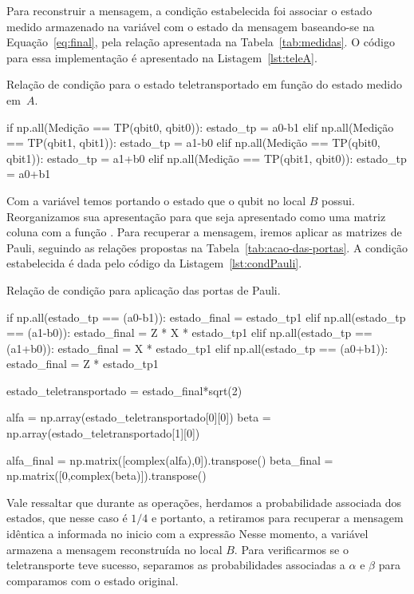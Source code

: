 Para reconstruir a mensagem, a condição estabelecida foi associar o estado medido armazenado na variável  com o estado da mensagem baseando-se na Equação~\eqref{eq:final}, pela relação apresentada na Tabela~\ref{tab:medidas}. O código para essa implementação é apresentado na Listagem~\ref{lst:teleA}.

\begin{listing}[ht!]
  \caption{Relação de condição para o estado teletransportado em função do estado medido em~\(A\).}\label{lst:teleA}
  \begin{pycode}
      if np.all(Medição == TP(qbit0, qbit0)):
          estado_tp = a0-b1
      elif np.all(Medição == TP(qbit1, qbit1)):
          estado_tp = a1-b0
      elif np.all(Medição == TP(qbit0, qbit1)):
          estado_tp = a1+b0
      elif np.all(Medição == TP(qbit1, qbit0)):
          estado_tp = a0+b1
  \end{pycode}
\end{listing}

Com a variável  temos portando o estado que o qubit no local \(B\) possui. Reorganizamos sua apresentação para que seja apresentado como uma matriz coluna com a função . Para recuperar a mensagem, iremos aplicar as matrizes de Pauli, seguindo as relações propostas na Tabela~\ref{tab:acao-das-portas}. A condição estabelecida é dada pelo código da Listagem~\ref{lst:condPauli}.

\begin{listing}[ht!]
  \caption{Relação de condição para aplicação das portas de Pauli.}\label{lst:condPauli}
  \begin{pycode}
      if np.all(estado_tp == (a0-b1)):
          estado_final = estado_tp1
      elif np.all(estado_tp == (a1-b0)):
          estado_final = Z * X * estado_tp1
      elif np.all(estado_tp == (a1+b0)):
          estado_final = X * estado_tp1
      elif np.all(estado_tp == (a0+b1)):
          estado_final = Z * estado_tp1
    
      estado_teletransportado = estado_final*sqrt(2)

      alfa = np.array(estado_teletransportado[0][0])
	  beta = np.array(estado_teletransportado[1][0])

      alfa_final = np.matrix([complex(alfa),0]).transpose()
      beta_final = np.matrix([0,complex(beta)]).transpose()
  \end{pycode}
\end{listing}

Vale ressaltar que durante as operações, herdamos a probabilidade associada dos estados, que nesse caso é $1/4$ e portanto, a retiramos para recuperar a mensagem idêntica a informada no inicio com a expressão Nesse momento, a variável  armazena a mensagem reconstruída no local \(B\). Para verificarmos se o teletransporte teve sucesso, separamos as probabilidades associadas a $\alpha$ e $\beta$ para comparamos com o estado original.

